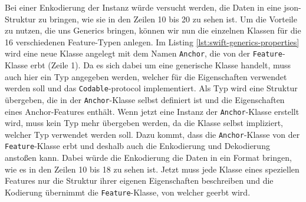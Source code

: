 Bei einer Enkodierung der Instanz würde versucht werden, die Daten in eine \ac{json}-Struktur zu bringen, wie sie in den Zeilen 10 bis 20 zu sehen ist.
Um die Vorteile zu nutzen, die uns Generics bringen, können wir nun die einzelnen Klassen für die 16 verschiedenen Feature-Typen anlegen.
Im Listing \ref{lst:swift-generics-properties} wird eine neue Klasse angelegt mit dem Namen \texttt{Anchor}, die von der \texttt{Feature}-Klasse erbt (Zeile 1).
Da es sich dabei um eine generische Klasse handelt, muss auch hier ein Typ angegeben werden, welcher für die Eigenschaften verwendet werden soll und das \texttt{Codable}-\Gls{protocol} implementiert.
Als Typ wird eine Struktur übergeben, die in der \texttt{Anchor}-Klasse selbst definiert ist und die Eigenschaften eines Anchor-Features enthält.
Wenn jetzt eine Instanz der \texttt{Anchor}-Klasse erstellt wird, muss kein Typ mehr übergeben werden, da die Klasse selbst impliziert, welcher Typ verwendet werden soll.
Dazu kommt, dass die \texttt{Anchor}-Klasse von der \texttt{Feature}-Klasse erbt und deshalb auch die Enkodierung und Dekodierung anstoßen kann.
Dabei würde die Enkodierung die Daten in ein Format bringen, wie es in den Zeilen 10 bis 18 zu sehen ist.\pbreak%
%
Jetzt muss jede Klasse eines speziellen Features nur die Struktur ihrer eigenen Eigenschaften beschreiben und die Kodierung übernimmt die \texttt{Feature}-Klasse, von welcher geerbt wird.

